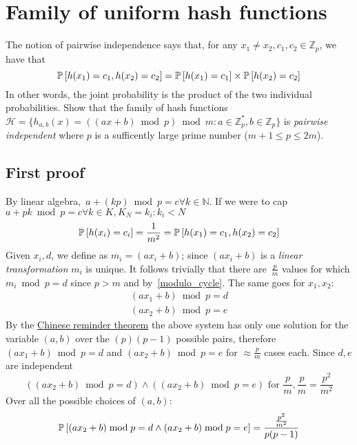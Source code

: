 \section{Family of uniform hash functions}

The notion of pairwise independence says that, for any $x_1 \neq x_2, c_1, c_2
\in \mathbb{Z}_p$, we have that
\begin{equation}
  \label{equation:pairwise-independence}
  \operatorname*{\mathbb{P}}\left[{h(x_1)= c_1, h(x_2) = c_2}\right] = \operatorname*{\mathbb{P}}\left[{h(x_1) = c_1}\right] \times \operatorname*{\mathbb{P}}\left[{h(x_2) = c_2}\right]
\end{equation}
In other words, the joint probability is the product of the two individual probabilities.
Show that the family of hash functions $\mathcal{H} = \{h_{a,b}(x) = ((ax + b) \bmod p) \bmod m :
a \in \mathbb{Z}^*_p,
b \in \mathbb{Z}_p \}$ is \emph{pairwise independent}
where $p$ is a sufficently large prime number ($m + 1 \leq p \leq 2m$).

\subsection{First proof}

By linear algebra,~\label{modulo_cycle}$a + (kp) \bmod p = c \forall k \in \mathbb{N}$.
If we were to cap $a + pk \bmod p = c \forall k \in K, K_{N} = {k_{i}: k_{i} < N}$
\begin{equation*}
  \operatorname*{\mathbb{P}}\left[{h(x_{i}) = c_{i}}\right] = \frac{1}{m^{2}} = \operatorname*{\mathbb{P}}\left[{h(x_{1}) = c_{1}, h(x_{2}) = c_{2}}\right]
\end{equation*}
Given $x_{i}, d$, we define as $m_{i} = (a x_{i} + b)$; since $(a x_{i} + b)$
is a \emph{linear transformation} $m_{i}$ is unique.
It follows trivially that there are~\label{p_over_m}$\frac{p}{m}$ values for which $m_{i} \bmod p = d$
since $p > m$ and by~\ref{modulo_cycle}.
The same goes for $x_{1}, x_{2}$:
\begin{gather*}
  (a x_{1} + b) \bmod p = d \\
  (a x_{2} + b) \bmod p = e
\end{gather*}
By the \href{http://en.wikipedia.org/wiki/Chinese_remainder_theorem}{Chinese
reminder theorem} the above system has only one solution for the variable $(a, b)$
over the $(p)(p - 1)$ possible pairs, therefore $(a x_{1} + b) \bmod p = d$ and
$(a x_{2} + b) \bmod p = e$
for $\approx \frac{p}{m}$ cases each.
Since $d, e$ are independent
\begin{equation*}
  ((a x_{2} + b) \bmod p = d) \wedge ((a x_{2} + b) \bmod p = e) \textrm{ for }
  \frac{p}{m}, \frac{p}{m} = \frac{p^{2}}{m^{2}}
\end{equation*}
Over all the possible choices of $(a, b)$:
\begin{equation*}
  \operatorname*{\mathbb{P}}\left[{(a x_{2} + b) \bmod p = d \wedge  (a x_{2} + b) \bmod p = e}\right] = \frac{\frac{p^{2}}{m^{2}}}{p(p - 1)}
\end{equation*}

